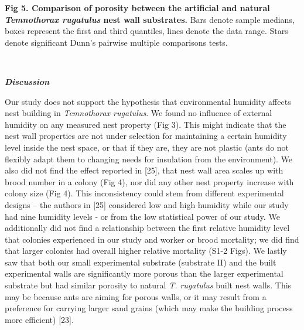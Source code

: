\documentclass[3p]{elsarticle} %
\begin{document}
\textbf{Fig 5. Comparison of porosity between the artificial and natural
\emph{Temnothorax rugatulus} nest wall substrates.} Bars denote sample
medians, boxes represent the first and third quantiles, lines denote the
data range. Stars denote significant Dunn's pairwise multiple
comparisons tests.

~

\textbf{\emph{Discussion}}

Our study does not support the hypothesis that environmental humidity
affects nest building in \emph{Temnothorax rugatulus}. We found no
influence of external humidity on any measured nest property (Fig 3).
This might indicate that the nest wall properties are not under
selection for maintaining a certain humidity level inside the nest
space, or that if they are, they are not plastic (ants do not flexibly
adapt them to changing needs for insulation from the environment). We
also did not find the effect reported in {[}25{]}, that nest wall area
scales up with brood number in a colony (Fig 4), nor did any other nest
property increase with colony size (Fig 4). This inconsistency could
stem from different experimental designs -- the authors in {[}25{]}
considered low and high humidity while our study had nine humidity
levels - or from the low statistical power of our study. We additionally
did not find a relationship between the first relative humidity level
that colonies experienced in our study and worker or brood mortality; we
did find that larger colonies had overall higher relative mortality
(S1-2 Figs). We lastly saw that both our small experimental substrate
(substrate II) and the built experimental walls are significantly more
porous than the larger experimental substrate but had similar porosity
to natural \emph{T. rugatulus} built nest walls. This may be because
ants are aiming for porous walls, or it may result from a preference for
carrying larger sand grains (which may make the building process more
efficient) {[}23{]}.
\end{document}

